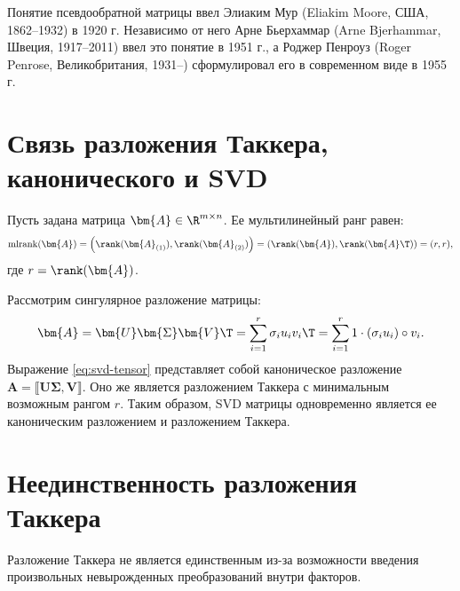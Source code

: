 \begin{tcbremark}
    Понятие псевдообратной матрицы ввел Элиаким Мур (Eliakim Moore, США, 1862–1932) в 1920 г. Независимо от него Арне Бьерхаммар (Arne Bjerhammar, Швеция, 1917–2011) ввел это понятие в 1951 г., а Роджер Пенроуз (Roger Penrose, Великобритания, 1931–) сформулировал его в современном виде в 1955 г.
\end{tcbremark}

\section{Связь разложения Таккера, канонического и SVD}
\label{sec:svd-tucker-cp}

Пусть задана матрица $\bm{A} \in \R^{m \times n}$. Ее мультилинейный ранг равен:
\[
    \operatorname{mlrank}(\bm{A}) = \left( \rank(\bm{A}_{(1)}), \rank(\bm{A}_{(2)}) \right) = \left( \rank(\bm{A}), \rank(\bm{A}\T) \right) = (r, r),
\]
где $r = \rank(\bm{A})$.

Рассмотрим сингулярное разложение матрицы:
\begin{equation}
    \bm{A} = \bm{U} \bm{\Sigma} \bm{V}\T = \sum_{i=1}^r \sigma_i u_i v_i\T = \sum_{i=1}^r 1 \cdot (\sigma_i u_i) \circ v_i.
    \label{eq:svd-tensor}
\end{equation}
Выражение \cref{eq:svd-tensor} представляет собой каноническое разложение $\bm{A} = \llbracket \bm{U}\bm{\Sigma}, \bm{V} \rrbracket$.
Оно же является разложением Таккера с минимальным возможным рангом $r$. Таким образом, SVD матрицы одновременно является ее каноническим разложением и разложением Таккера.

\section{Неединственность разложения Таккера}
\label{sec:tucker-non-uniqueness}

Разложение Таккера не является единственным из-за возможности введения произвольных невырожденных преобразований внутри факторов.

